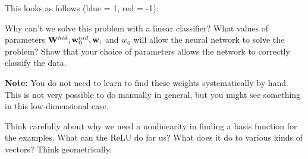 \documentclass[11pt,letterpaper]{article}
\begin{document}
This looks as follows (blue = 1, red = -1):
%
\begin{center}
\end{center}

Why can't we solve this problem with a linear classifier?  What values
of parameters $\mathbf{W}^{hid}, \mathbf{w}_0^{hid}, \mathbf{w},$ and $w_0$ will allow the
neural network to solve the problem? Show that your choice of parameters
allows the network to correctly classify the data. 

\noindent \textbf{Note:} You do not need to learn to find these weights systematically by hand.
This is not very possible to do manually in general, but you might see something in this low-dimensional case.

 Think carefully about why we need a nonlinearity
in finding a basis function for the examples.  What can the ReLU do
for us? What does it do to various kinds of vectors? Think geometrically.
\end{document}
